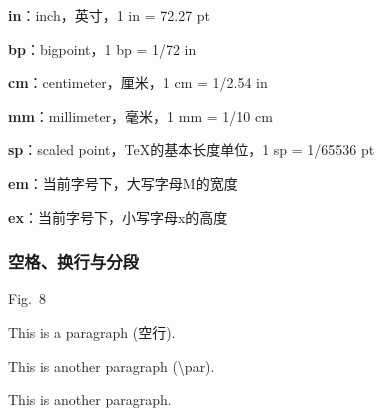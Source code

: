 \documentclass{ctexart}
\begin{document}
            \textbf{in}：inch，英寸，1 in = 72.27 pt

            \textbf{bp}：bigpoint，1 bp = 1/72 in

            \textbf{cm}：centimeter，厘米，1 cm = 1/2.54 in

            \textbf{mm}：millimeter，毫米，1 mm = 1/10 cm

            \textbf{sp}：scaled point，\TeX 的基本长度单位，1 sp = 1/65536 pt

            \textbf{em}：当前字号下，大写字母M的宽度

            \textbf{ex}：当前字号下，小写字母x的高度


        \subsubsection{空格、换行与分段}
            Fig.~8

            This is a paragraph (空行). 
            
            This is another paragraph (\textbackslash par). 
            \par This is another paragraph. 

            \mbox{}
\end{document}
